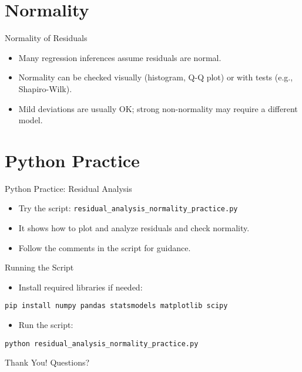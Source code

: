 \documentclass[aspectratio=169]{beamer}
\begin{document}
\section{Normality}
\begin{frame}{Normality of Residuals}
  \begin{itemize}
    \item Many regression inferences assume residuals are normal.
    \item Normality can be checked visually (histogram, Q-Q plot) or with tests (e.g., Shapiro-Wilk).
    \item Mild deviations are usually OK; strong non-normality may require a different model.
  \end{itemize}
\end{frame}

\section{Python Practice}
\begin{frame}{Python Practice: Residual Analysis}
  \begin{itemize}
    \item Try the script: \texttt{residual\_analysis\_normality\_practice.py}
    \item It shows how to plot and analyze residuals and check normality.
    \item Follow the comments in the script for guidance.
  \end{itemize}
\end{frame}

\begin{frame}[fragile]{Running the Script}
  \begin{itemize}
    \item Install required libraries if needed:
  \end{itemize}
  \begin{verbatim}
pip install numpy pandas statsmodels matplotlib scipy
  \end{verbatim}
  \begin{itemize}
    \item Run the script:
  \end{itemize}
  \begin{verbatim}
python residual_analysis_normality_practice.py
  \end{verbatim}
\end{frame}

\begin{frame}
  \centering
  \Huge Thank You!
  \vspace{1cm}
  \normalsize Questions?
\end{frame}
\end{document}
